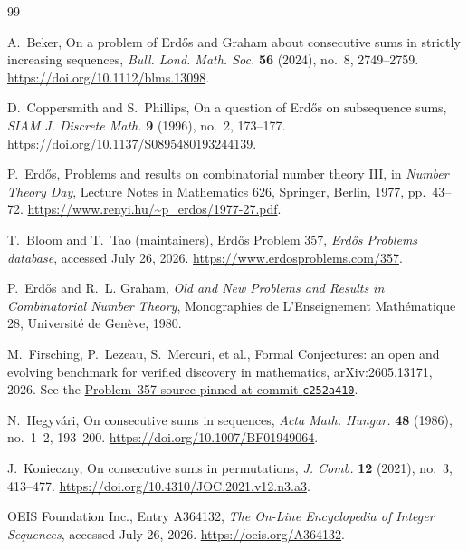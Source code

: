 \documentclass[11pt]{article}
\numberwithin{equation}{section}
\theoremstyle{remark}
\begin{document}
\begin{thebibliography}{99}

A.~Beker,
\newblock On a problem of Erd\H{o}s and Graham about consecutive sums
in strictly increasing sequences,
\newblock \emph{Bull. Lond. Math. Soc.} \textbf{56} (2024), no.~8,
2749--2759.
\newblock \url{https://doi.org/10.1112/blms.13098}.

D.~Coppersmith and S.~Phillips,
\newblock On a question of Erd\H{o}s on subsequence sums,
\newblock \emph{SIAM J. Discrete Math.} \textbf{9} (1996), no.~2,
173--177.
\newblock \url{https://doi.org/10.1137/S0895480193244139}.

P.~Erd\H{o}s,
\newblock Problems and results on combinatorial number theory III,
\newblock in \emph{Number Theory Day}, Lecture Notes in Mathematics
626, Springer, Berlin, 1977, pp.~43--72.
\newblock \url{https://www.renyi.hu/~p_erdos/1977-27.pdf}.

T.~Bloom and T.~Tao (maintainers),
\newblock Erd\H{o}s Problem 357,
\newblock \emph{Erd\H{o}s Problems database}, accessed July 26, 2026.
\newblock \url{https://www.erdosproblems.com/357}.

P.~Erd\H{o}s and R.~L. Graham,
\newblock \emph{Old and New Problems and Results in Combinatorial
Number Theory},
\newblock Monographies de L'Enseignement Math\'ematique 28,
Universit\'e de Gen\`eve, 1980.

M.~Firsching, P.~Lezeau, S.~Mercuri, et al.,
\newblock Formal Conjectures: an open and evolving benchmark for
verified discovery in mathematics,
\newblock arXiv:2605.13171, 2026.
\newblock See the
\href{https://github.com/google-deepmind/formal-conjectures/blob/c252a41054125b5fd9c8356e2137cd9b55337657/FormalConjectures/ErdosProblems/357.lean}
{Problem~357 source pinned at commit \texttt{c252a410}}.

N.~Hegyv\'ari,
\newblock On consecutive sums in sequences,
\newblock \emph{Acta Math. Hungar.} \textbf{48} (1986), no.~1--2,
193--200.
\newblock \url{https://doi.org/10.1007/BF01949064}.

J.~Konieczny,
\newblock On consecutive sums in permutations,
\newblock \emph{J. Comb.} \textbf{12} (2021), no.~3, 413--477.
\newblock \url{https://doi.org/10.4310/JOC.2021.v12.n3.a3}.

OEIS Foundation Inc.,
\newblock Entry A364132,
\newblock \emph{The On-Line Encyclopedia of Integer Sequences},
accessed July 26, 2026.
\newblock \url{https://oeis.org/A364132}.

\end{thebibliography}
\end{document}
